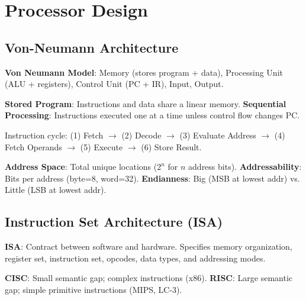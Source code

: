 \section{Processor Design}

\subsection{Von-Neumann Architecture}

\begin{definition}
	\textbf{Von Neumann Model}: Memory (stores program + data), Processing Unit (ALU + registers), Control Unit (PC + IR), Input, Output.
\end{definition}

\begin{important}
	\textbf{Stored Program}: Instructions and data share a linear memory.
	\textbf{Sequential Processing}: Instructions executed one at a time unless control flow changes PC.
\end{important}

\begin{remark}
	Instruction cycle: (1) Fetch $\to$ (2) Decode $\to$ (3) Evaluate Address $\to$ (4) Fetch Operands $\to$ (5) Execute $\to$ (6) Store Result.
\end{remark}

\begin{definition}
	\textbf{Address Space}: Total unique locations ($2^n$ for $n$ address bits).
	\textbf{Addressability}: Bits per address (byte=8, word=32).
	\textbf{Endianness}: Big (MSB at lowest addr) vs. Little (LSB at lowest addr).
\end{definition}

\subsection{Instruction Set Architecture (ISA)}

\begin{definition}
	\textbf{ISA}: Contract between software and hardware. Specifies memory organization, register set, instruction set, opcodes, data types, and addressing modes.
\end{definition}

\begin{lemma}
	\textbf{CISC}: Small semantic gap; complex instructions (x86).
	\textbf{RISC}: Large semantic gap; simple primitive instructions (MIPS, LC-3).
\end{lemma}

